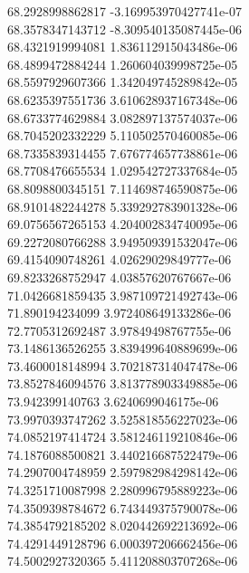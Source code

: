 {68.2928998862817 -3.169953970427741e-07 \\
68.3578347143712 -8.309540135087445e-06 \\
68.4321919994081 1.836112915043486e-06 \\
68.4899472884244 1.260604039998725e-05 \\
68.5597929607366 1.342049745289842e-05 \\
68.6235397551736 3.610628937167348e-06 \\
68.6733774629884 3.082897137574037e-06 \\
68.7045202332229 5.110502570460085e-06 \\
68.7335839314455 7.676774657738861e-06 \\
68.7708476655534 1.029542727337684e-05 \\
68.8098800345151 7.114698746590875e-06 \\
68.9101482244278 5.339292783901328e-06 \\
69.0756567265153 4.204002834740095e-06 \\
69.2272080766288 3.949509391532047e-06 \\
69.4154090748261 4.02629029849777e-06 \\
69.8233268752947 4.03857620767667e-06 \\
71.0426681859435 3.987109721492743e-06 \\
71.890194234099 3.972408649133286e-06 \\
72.7705312692487 3.97849498767755e-06 \\
73.1486136526255 3.839499640889699e-06 \\
73.4600018148994 3.702187314047478e-06 \\
73.8527846094576 3.813778903349885e-06 \\
73.942399140763 3.6240699046175e-06 \\
73.9970393747262 3.525818556227023e-06 \\
74.0852197414724 3.581246119210846e-06 \\
74.1876088500821 3.440216687522479e-06 \\
74.2907004748959 2.597982984298142e-06 \\
74.3251710087998 2.280996795889223e-06 \\
74.3509398784672 6.743449375790078e-06 \\
74.3854792185202 8.020442692213692e-06 \\
74.4291449128796 6.000397206662456e-06 \\
74.5002927320365 5.411208803707268e-06 \\
}

